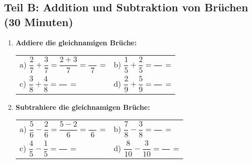 \subsection*{Teil B: Addition und Subtraktion von Brüchen (30 Minuten)}

\begin{enumerate}[label=\arabic*.]
    \item \textbf{Addiere die gleichnamigen Brüche:}

    \vspace{0.5cm}
    \begin{tabular}{ll}
        a) $\dfrac{2}{7} + \dfrac{3}{7} = \dfrac{2+3}{7} = \dfrac{\phantom{00}}{7}$ = \underline{\hspace{3cm}} &
        b) $\dfrac{1}{5} + \dfrac{2}{5} = \dfrac{\phantom{00}}{\phantom{00}}$ = \underline{\hspace{3cm}} \\[4ex]
        c) $\dfrac{3}{8} + \dfrac{4}{8} = \dfrac{\phantom{00}}{\phantom{00}}$ = \underline{\hspace{3cm}} &
        d) $\dfrac{2}{9} + \dfrac{5}{9} = \dfrac{\phantom{00}}{\phantom{00}}$ = \underline{\hspace{3cm}}
    \end{tabular}

    \vspace{1cm}

    \item \textbf{Subtrahiere die gleichnamigen Brüche:}
    
    \vspace{0.5cm}
    \begin{tabular}{ll}
        a) $\dfrac{5}{6} - \dfrac{2}{6} = \dfrac{5-2}{6} = \dfrac{\phantom{00}}{6}$ = \underline{\hspace{3cm}} &
        b) $\dfrac{7}{8} - \dfrac{3}{8} = \dfrac{\phantom{00}}{\phantom{00}}$ = \underline{\hspace{3cm}} \\[4ex]
        c) $\dfrac{4}{5} - \dfrac{1}{5} = \dfrac{\phantom{00}}{\phantom{00}}$ = \underline{\hspace{3cm}} &
        d) $\dfrac{8}{10} - \dfrac{3}{10} = \dfrac{\phantom{00}}{\phantom{00}}$ = \underline{\hspace{3cm}}
    \end{tabular}

    \vspace{1cm}


\end{enumerate}
